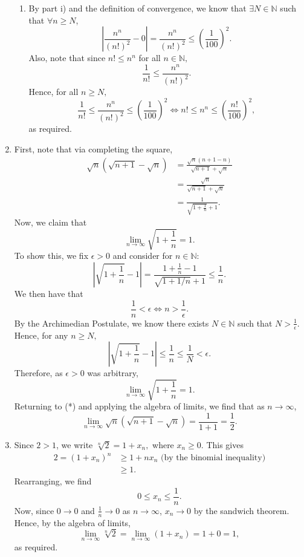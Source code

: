 \documentclass[
  17pt,
  a4paper]{extarticle}
\theoremstyle{plain}
\theoremstyle{definition}
\theoremstyle{plain}
\theoremstyle{plain}
\theoremstyle{plain}
\theoremstyle{plain}
\theoremstyle{definition}
\theoremstyle{definition}
\theoremstyle{remark}
\theoremstyle{remark}
\renewcommand{\;}{\,}
\begin{document}
\begin{enumerate}
\begin{enumerate}
  \item
    By part i) and the definition of convergence, we know that \(\exists N \in \mathbb{N}\) such that \(\forall n \geq N\), \[\left\lvert\frac{n^n}{(n!)^2} - 0 \right\rvert =  \frac{n^n}{(n!)^2} \leq \left(\frac{1}{100}\right)^2.\] Also, note that since \(n! \leq n^n\) for all \(n \in \mathbb{N},\) \[\frac{1}{n!} \leq \frac{n^n}{(n!)^2}.\] Hence, for all \(n \geq N,\) \[\frac{1}{n!} \leq \frac{n^n}{(n!)^2} \leq \left(\frac{1}{100}\right)^2 \Longleftrightarrow n! \leq n^n \leq \left(\frac{n!}{100}\right)^2,\] as required.
  \end{enumerate}
\item
  First, note that via completing the square, \begin{align}\sqrt{n}(\sqrt{n+1} - \sqrt{n}) &= \frac{\sqrt{n}(n+1 - n)}{\sqrt{n+1} + \sqrt{n}}\nonumber\\ &= \frac{\sqrt{n}}{\sqrt{n+1} + \sqrt{n}}\nonumber\\ &= \frac{1}{\sqrt{1 + \frac{1}{n}} + 1}.\tag{*}\end{align} Now, we claim that \[\lim_{n \to \infty} \sqrt{1 + \frac{1}{n}} = 1.\] To show this, we fix \(\epsilon > 0\) and consider for \(n \in \mathbb{N}:\) \[\left\lvert \sqrt{1 + \frac{1}{n}} - 1\right\rvert = \frac{1 + \frac{1}{n}-1}{\sqrt{1 + 1/n}+1} \leq \frac{1}{n}.\] We then have that \[\frac{1}{n} < \epsilon \Longleftrightarrow n > \frac{1}{\epsilon}.\] By the Archimedian Postulate, we know there exists \(N \in \mathbb{N}\) such that \(N > \frac{1}{\epsilon}.\) Hence, for any \(n \geq N,\) \[\left\lvert \sqrt{1 + \frac{1}{n}} - 1\right\rvert \leq \frac{1}{n} \leq \frac{1}{N} < \epsilon.\] Therefore, as \(\epsilon > 0\) was arbitrary, \[\lim_{n \to \infty} \sqrt{1 + \frac{1}{n}} = 1.\] Returning to (*) and applying the algebra of limits, we find that as \(n \to \infty\), \[\lim_{n \to \infty}\sqrt{n}(\sqrt{n+1} - \sqrt{n}) = \frac{1}{1+1} = \frac{1}{2}.\]
\item
  Since \(2 > 1\), we write \(\sqrt[n]{2} = 1 + x_n,\) where \(x_n \geq 0\). This gives \begin{align*}
  2 = (1 + x_n)^n &\geq 1 + nx_n \;\; \text{(by the binomial inequality)}\\ &\geq 1. \end{align*} Rearranging, we find \[0 \leq x_n \leq \frac{1}{n}.\] Now, since \(0 \to 0\) and \(\frac{1}{n} \to 0\) as \(n \to \infty\), \(x_n \to 0\) by the sandwich theorem. Hence, by the algebra of limits, \[\lim_{n \to \infty} \sqrt[n]{2} = \lim_{n\to\infty}(1 + x_n) = 1 + 0 = 1,\] as required.
\end{enumerate}
\end{document}
